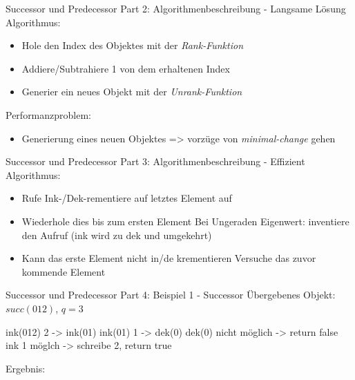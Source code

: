 \documentclass[aspectratio=169]{beamer}
\begin{document}
    \begin{frame}{Successor und Predecessor \newline Part 2: Algorithmenbeschreibung - Langsame Lösung}
    Algorithmus:
    \begin{itemize}
	    \item Hole den Index des Objektes mit der \textit{Rank-Funktion}
	    \item Addiere/Subtrahiere 1 von dem erhaltenen Index
	    \item Generier ein neues Objekt mit der \textit{Unrank-Funktion}
    \end{itemize} 
    Performanzproblem:
	\begin{itemize}
	    \item Generierung eines neuen Objektes \newline => vorzüge von \textit{minimal-change} gehen 
    \end{itemize}
    \end{frame}
        
    \begin{frame}{Successor und Predecessor \newline Part 3: Algorithmenbeschreibung - Effizient}
    Algorithmus:
    \begin{itemize}
	    \item Rufe Ink-/Dek-rementiere auf letztes Element auf
	    \item Wiederhole dies bis zum ersten Element \newline Bei Ungeraden Eigenwert: inventiere den Aufruf \newline (ink wird zu dek und umgekehrt)
	    \item Kann das erste Element nicht in/de krementieren \newline Versuche das zuvor kommende Element
    \end{itemize}
    \end{frame}
    
	\begin{frame}{Successor und Predecessor \newline Part 4: Beispiel 1 - Successor}
    Übergebenes Objekt: $succ(012)$, $q=3$ \newline
    
    ink(012) 2 -> ink(01)\newline
    ink(01)  1 -> dek(0) \newline
    dek(0)   nicht möglich -> return false \newline
    ink 1 möglch -> schreibe 2, return true \newline
    
    Ergebnis: 
    \end{frame}
\end{document}
